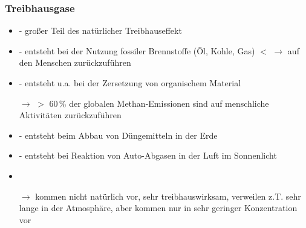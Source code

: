 \begin{frame}
	\frametitle{Treibhausgase}
	\begin{itemize}		
		\item  {\color{red}{Wasserdampf $H_2O$}} -  großer Teil des natürlicher Treibhauseffekt %
		\item  {\color{red}{Kohlenstoffdioxid $CO_2$}} -  entsteht bei der Nutzung fossiler Brennstoffe (Öl, Kohle, Gas) $<$ $\rightarrow$ auf den Menschen zurückzuführen  
		\item  {\color{red}{Methan $CH_4$}} - entsteht u.a. bei der Zersetzung von organischem Material
		\item[$\rightarrow$] $>$ 60\,\% der globalen Methan-Emissionen sind auf menschliche Aktivitäten zurückzuführen %
		\item  {\color{red}{Distickstoffmonoxid $N_2O$ (Lachgas)}} - entsteht beim Abbau von Düngemitteln in der Erde
		\item  {\color{red}{Ozon $O_3$}} - entsteht bei Reaktion von Auto-Abgasen in der Luft im Sonnenlicht
		\item {\color{red}{fluorierte Treibhausgase (F-Gase)}}
		\item[$\rightarrow$] kommen nicht natürlich vor, sehr treibhauswirksam, verweilen z.T. sehr lange in der Atmosphäre, %
		aber kommen nur in sehr geringer Konzentration vor
		
	\end{itemize}
\end{frame}

